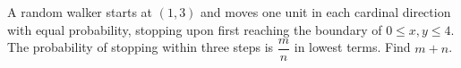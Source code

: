 A random walker starts at $(1,3)$ and moves one unit in each cardinal direction with equal probability, stopping upon first reaching the boundary of $0\le x,y\le4$. The probability of stopping within three steps is $\dfrac{m}{n}$ in lowest terms. Find $m+n$.

